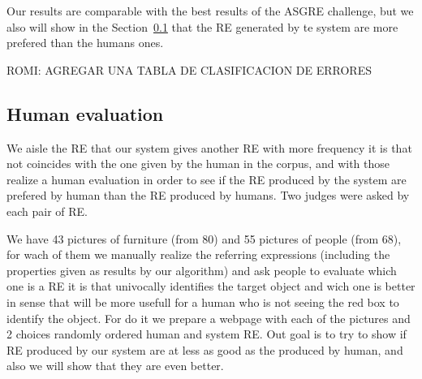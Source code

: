 Our results are comparable with the best results of the ASGRE challenge, but we also will show in the Section~\ref{sec:evaluation} that the RE generated by te system are more prefered than the humans ones.

ROMI: AGREGAR UNA TABLA DE CLASIFICACION DE ERRORES

\subsection{Human evaluation} \label{sec:evaluation}

We aisle the RE that our system gives another RE with more frequency it is that not coincides with the one given by the human in the corpus, and with those realize a human evaluation in order to see if the RE produced by the system are prefered by human than the RE produced by humans. Two judges were asked by each pair of RE.

We have 43 pictures of furniture (from 80) and 55 pictures of people (from 68), for wach of them we manually realize the referring expressions (including the properties given as results by our algorithm) and ask people to evaluate which one is a RE it is that univocally identifies the target object and wich one is better in sense that will be more usefull for a human who is not seeing the red box to identify the object. For do it we prepare a webpage with each of the pictures and 2 choices randomly ordered human and system RE. Out goal is to try to show if RE produced by our system are at less as good as the produced by human, and also we will show that they are even better.



